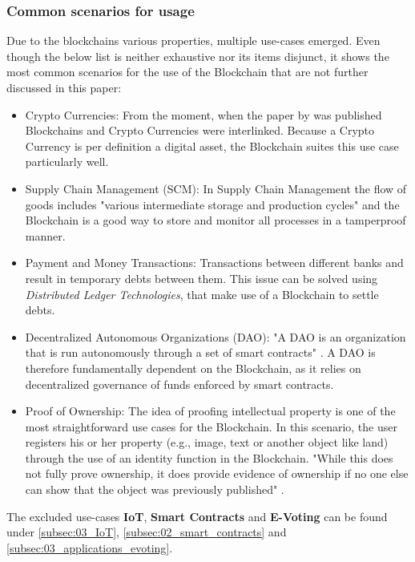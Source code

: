 \subsubsection{Common scenarios for usage}
Due to the blockchains various properties, multiple use-cases emerged. Even though the below list is neither exhaustive nor its items disjunct, it shows the most common scenarios for the use of the Blockchain\cite{Wust2017} that are not further discussed in this paper:
\begin{itemize}
  \item Crypto Currencies: From the moment, when the paper by \citeauthor{Nakamoto2008} was published Blockchains and Crypto Currencies were interlinked. Because a Crypto Currency is per definition a digital asset, the Blockchain suites this use case particularly well.
  \item Supply Chain Management (SCM): In Supply Chain Management the flow of goods includes "various intermediate storage and production cycles" \cite{Wust2017} and the Blockchain is a good way to store and monitor all processes in a tamperproof manner.
  \item Payment and Money Transactions: Transactions between different banks and result in temporary debts between them. This issue can be solved using \textit{Distributed Ledger Technologies}, that make use of a Blockchain to settle debts. 
  \item Decentralized Autonomous Organizations (DAO): "A DAO is an organization that is run autonomously through a set of smart contracts" \cite{Wust2017}. A DAO is therefore fundamentally dependent on the Blockchain, as it relies on decentralized governance of funds enforced by smart contracts.
  \item Proof of Ownership: The idea of proofing intellectual property is one of the most straightforward use cases for the Blockchain. In this scenario, the user registers his or her property (e.g., image, text or another object like land) through the use of an identity function in the Blockchain. "While this does not fully prove ownership, it does provide evidence of ownership if no one else can show that the object was previously published" \cite{Wust2017}.   
\end{itemize}
The excluded use-cases \textbf{IoT}, \textbf{Smart Contracts} and \textbf{E-Voting} can be found under \ref{subsec:03_IoT}, \ref{subsec:02_smart_contracts} and \ref{subsec:03_applications_evoting}.

